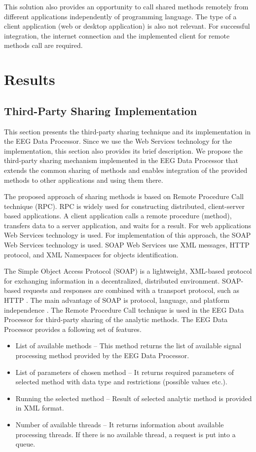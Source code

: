 \documentclass{frontiersSCNS} %
\begin{document}
This solution also provides an opportunity to call shared methods remotely from different applications independently of programming language. The type of a client application (web or desktop application) is also not relevant. For successful integration, the internet connection and the implemented client for remote methods call are required.

\section{Results}

\subsection{Third-Party Sharing Implementation}

This section presents the third-party sharing technique and its implementation in the EEG Data Processor. Since we use the Web Services technology for the implementation, this section also provides its brief description. We propose the third-party sharing mechanism implemented in the EEG Data Processor that extends the common sharing of methods and enables integration of the provided methods to other applications and using them there.

The proposed approach of sharing methods is based on Remote Procedure Call technique (RPC). RPC is widely used for constructing distributed, client-server based applications. A client application calls a remote procedure (method), transfers data to a server application, and waits for a result. For web applications Web Services technology \cite{Liu06} is used. For implementation of this approach, the SOAP Web Services technology is used. SOAP Web Services \cite{Liu06} use XML messages, HTTP protocol, and XML Namespaces for objects identification.

The Simple Object Access Protocol (SOAP) is a lightweight, XML-based protocol for exchanging information in a decentralized, distributed environment. SOAP-based requests and responses are combined with a transport protocol, such as HTTP \cite{WS}. The main advantage of SOAP is protocol, language, and platform independence \cite{WS}.
The Remote Procedure Call technique is used in the EEG Data Processor for third-party sharing of the analytic methods. The EEG Data Processor provides a following set of features.

\begin{itemize}
\item List of available methods – This method returns the list of available signal processing method provided by the EEG Data Processor.
\item List of parameters of chosen method – It returns required parameters of selected method with data type and restrictions (possible values etc.).
\item Running the selected method – Result of selected analytic method is provided in XML format.
\item Number of available threads – It returns information about available processing threads. If there is no available thread, a request is put into a queue.

\end{itemize}
\end{document}
